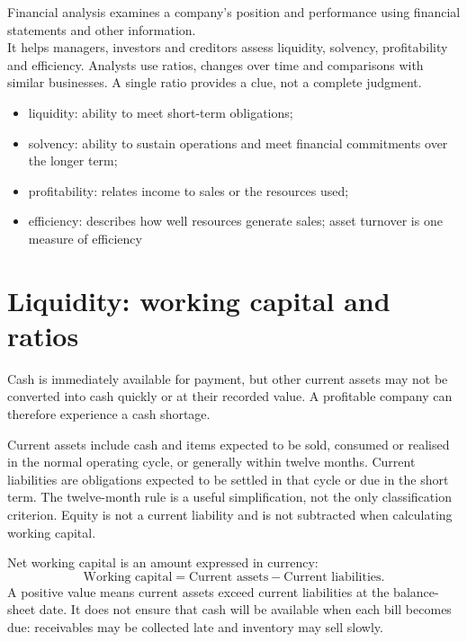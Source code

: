 \documentclass[12pt,a4paper]{report}
\begin{document}
Financial analysis examines a company's position and performance using financial statements and other information. 
\\It helps managers, investors and creditors assess liquidity, solvency, profitability and efficiency. Analysts use ratios, changes over time and comparisons with similar businesses. A single ratio provides a clue, not a complete judgment.
\begin{itemize}
    \item liquidity: ability to meet short-term obligations;
    \item solvency: ability to sustain operations and meet financial commitments over the longer term;
    \item profitability: relates income to sales or the resources used;
    \item efficiency: describes how well resources generate sales; asset turnover is one measure of efficiency  
\end{itemize}

\section{Liquidity: working capital and ratios}

Cash is immediately available for payment, but other current assets may not be converted into cash quickly or at their recorded value. A profitable company can therefore experience a cash shortage.

Current assets include cash and items expected to be sold, consumed or realised in the normal operating cycle, or generally within twelve months. Current liabilities are obligations expected to be settled in that cycle or due in the short term. The twelve-month rule is a useful simplification, not the only classification criterion. Equity is not a current liability and is not subtracted when calculating working capital.

Net working capital is an amount expressed in currency:
\begin{equation*}
\boxed{\text{Working capital}=\text{Current assets}-\text{Current liabilities}.}
\end{equation*}
A positive value means current assets exceed current liabilities at the balance-sheet date. It does not ensure that cash will be available when each bill becomes due: receivables may be collected late and inventory may sell slowly.
\end{document}
